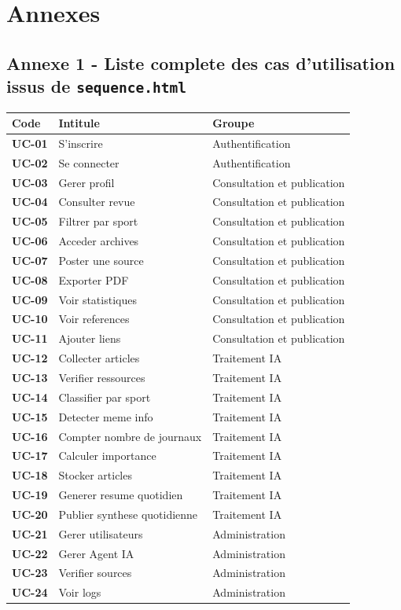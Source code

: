 \documentclass[12pt,a4paper,oneside]{report}
\begin{document}
\chapter*{Annexes}

\section*{Annexe 1 - Liste complete des cas d'utilisation issus de \texttt{sequence.html}}

\begin{longtable}{>{\bfseries}p{2cm}p{7cm}p{4cm}}
\toprule
Code & Intitule & Groupe \\
\midrule
\endhead
UC-01 & S'inscrire & Authentification \\
UC-02 & Se connecter & Authentification \\
UC-03 & Gerer profil & Consultation et publication \\
UC-04 & Consulter revue & Consultation et publication \\
UC-05 & Filtrer par sport & Consultation et publication \\
UC-06 & Acceder archives & Consultation et publication \\
UC-07 & Poster une source & Consultation et publication \\
UC-08 & Exporter PDF & Consultation et publication \\
UC-09 & Voir statistiques & Consultation et publication \\
UC-10 & Voir references & Consultation et publication \\
UC-11 & Ajouter liens & Consultation et publication \\
UC-12 & Collecter articles & Traitement IA \\
UC-13 & Verifier ressources & Traitement IA \\
UC-14 & Classifier par sport & Traitement IA \\
UC-15 & Detecter meme info & Traitement IA \\
UC-16 & Compter nombre de journaux & Traitement IA \\
UC-17 & Calculer importance & Traitement IA \\
UC-18 & Stocker articles & Traitement IA \\
UC-19 & Generer resume quotidien & Traitement IA \\
UC-20 & Publier synthese quotidienne & Traitement IA \\
UC-21 & Gerer utilisateurs & Administration \\
UC-22 & Gerer Agent IA & Administration \\
UC-23 & Verifier sources & Administration \\
UC-24 & Voir logs & Administration \\
\bottomrule
\end{longtable}
\end{document}
